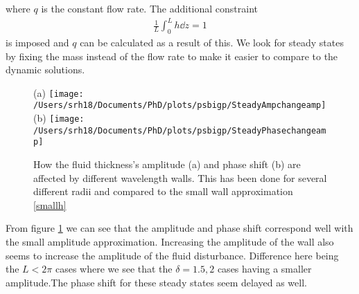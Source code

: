 \documentclass{jfm}
\begin{document}
 where $q$ is the constant flow rate. The additional constraint
\begin{align}
	\frac{1}{L}\int_0^L h \dd{z} = 1
\end{align}
is imposed and $q$ can be calculated as a result of this. We look for steady states by fixing the mass instead of the flow rate to make it easier to compare to the dynamic solutions.
\begin{figure}
	\vspace{.25cm}
	\centering
	{\footnotesize (a) }\texttt{[image: /Users/srh18/Documents/PhD/plots/psbigp/SteadyAmpchangeamp]}{\footnotesize  (b)   }\texttt{[image: /Users/srh18/Documents/PhD/plots/psbigp/SteadyPhasechangeamp]}
	\caption{How the fluid thickness's amplitude (a) and phase shift (b) are affected by different wavelength walls. This has been done for several different radii and compared to the small wall approximation \eqref{smallh}}
	\label{deltasteady}
\end{figure}
From figure \ref{deltasteady} we can see that the amplitude and phase shift correspond well with the small amplitude approximation. Increasing the amplitude of the wall also seems to increase the amplitude of the fluid disturbance. Difference here being the $L<2\pi$ cases where we see that the $\delta = 1.5,2$ cases having a smaller amplitude.The phase shift for these steady states seem delayed as well.
\end{document}
